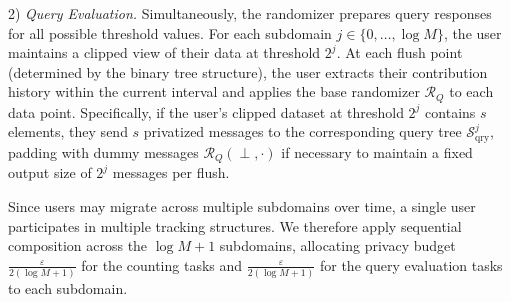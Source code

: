     2) \textit{Query Evaluation.} Simultaneously, the randomizer prepares query responses for all possible threshold values. For each subdomain $j \in \{0, \dots, \log M\}$, the user maintains a clipped view of their data at threshold $2^j$. At each flush point (determined by the binary tree structure), the user extracts their contribution history within the current interval and applies the base randomizer $\mathcal{R}_Q$ to each data point. Specifically, if the user's clipped dataset at threshold $2^j$ contains $s$ elements, they send $s$ privatized messages to the corresponding query tree $\mathcal{S}^j_{\text{qry}}$, padding with dummy messages $\mathcal{R}_Q(\perp, \cdot)$ if necessary to maintain a fixed output size of $2^j$ messages per flush.



Since users may migrate across multiple subdomains over time, a single user participates in multiple tracking structures. We therefore apply sequential composition across the $\log M+1 $ subdomains, allocating privacy budget $\frac{\varepsilon}{2(\log M +1)}$ for the counting tasks and $\frac{\varepsilon}{2(\log M +1)}$ for the query evaluation tasks to each subdomain.
